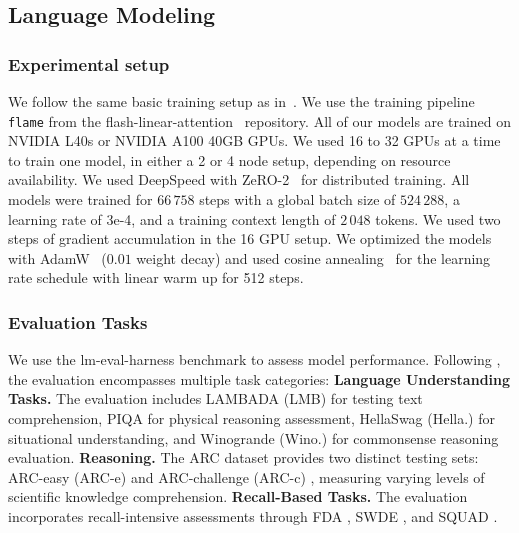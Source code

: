 \documentclass{article} %
\begin{document}
\subsection{Language Modeling}\label{app:language-modeling}

\subsubsection{Experimental setup}\label{app:lm-experimental-setup}
We follow the same basic training setup as in~\citep{grazzi-iclr25a}. We use the training pipeline \texttt{flame} from the flash-linear-attention~\citep{yang2024fla} repository. All of our models are trained on NVIDIA L40s or NVIDIA A100 40GB GPUs. We used 16 to 32 GPUs at a time to train one model, in either a 2 or 4 node setup, depending on resource availability. We used DeepSpeed with ZeRO-2~\citep{rajbhandari2020zero} for distributed training. All models were trained for $66\,758$ steps with a global batch size of $524\,288$, a learning rate of 3e-4, and a training context length of $2\,048$ tokens. We used two steps of gradient accumulation in the 16 GPU setup. We optimized the models with AdamW~\citep{loshchilov-iclr19a} ($0.01$ weight decay) and used cosine annealing~\citep{loshchilov-iclr17a} for the learning rate schedule with linear warm up for 512 steps.

\subsubsection{Evaluation Tasks}\label{app:task_details}
We use the lm-eval-harness benchmark \citep{eval-harness} to assess model performance. Following \citet{yang-neurips24a}, the evaluation encompasses multiple task categories:
\textbf{Language Understanding Tasks.}
The evaluation includes LAMBADA (LMB) \citep{paperno2016lambada} for testing text comprehension, PIQA \citep{bisk2020piqa} for physical reasoning assessment, HellaSwag (Hella.) \citep{zellers2019hellaswag} for situational understanding, and Winogrande (Wino.) \citep{sakaguchi2021winogrande} for commonsense reasoning evaluation.
\textbf{Reasoning.}
The ARC dataset provides two distinct testing sets: ARC-easy (ARC-e) and ARC-challenge (ARC-c) \citep{clark2018think}, measuring varying levels of scientific knowledge comprehension.
\textbf{Recall-Based Tasks.}
The evaluation incorporates recall-intensive assessments through FDA \citep{arora2023language}, SWDE \citep{lockard2019open}, and SQUAD \citep{rajpurkar2018know}. 
\end{document}
